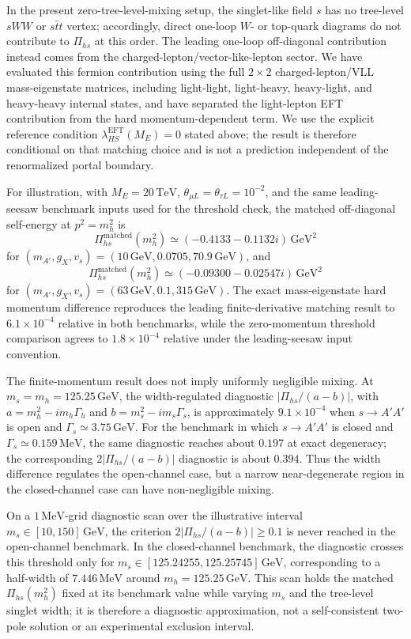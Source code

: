 \documentclass[12pt,a4paper]{article}
\begin{document}
In the present zero-tree-level-mixing setup, the singlet-like field \(s\) has no tree-level \(sWW\) or \(s\bar t t\) vertex; accordingly, direct one-loop \(W\)- or top-quark diagrams do not contribute to \(\Pi_{hs}\) at this order. The leading one-loop off-diagonal contribution instead comes from the charged-lepton/vector-like-lepton sector. We have evaluated this fermion contribution using the full \(2\times2\) charged-lepton/VLL mass-eigenstate matrices, including light-light, light-heavy, heavy-light, and heavy-heavy internal states, and have separated the light-lepton EFT contribution from the hard momentum-dependent term. We use the explicit reference condition \(\lambda_{HS}^{\mathrm{EFT}}(M_E)=0\) stated above; the result is therefore conditional on that matching choice and is not a prediction independent of the renormalized portal boundary.

For illustration, with \(M_E=20\,\mathrm{TeV}\), \(\theta_{\mu L}=\theta_{\tau L}=10^{-2}\), and the same leading-seesaw benchmark inputs used for the threshold check, the matched off-diagonal self-energy at \(p^2=m_h^2\) is
\[
\Pi_{hs}^{\mathrm{matched}}(m_h^2)
\simeq(-0.4133-0.1132i)\,\mathrm{GeV}^2
\]
for \((m_{A'},g_X,v_s)=(10\,\mathrm{GeV},0.0705,70.9\,\mathrm{GeV})\), and
\[
\Pi_{hs}^{\mathrm{matched}}(m_h^2)
\simeq(-0.09300-0.02547i)\,\mathrm{GeV}^2
\]
for \((m_{A'},g_X,v_s)=(63\,\mathrm{GeV},0.1,315\,\mathrm{GeV})\). The exact mass-eigenstate hard momentum difference reproduces the leading finite-derivative matching result to \(6.1\times10^{-4}\) relative in both benchmarks, while the zero-momentum threshold comparison agrees to \(1.8\times10^{-4}\) relative under the leading-seesaw input convention.

The finite-momentum result does not imply uniformly negligible mixing. At \(m_s=m_h=125.25\,\mathrm{GeV}\), the width-regulated diagnostic \(|\Pi_{hs}/(a-b)|\), with \(a=m_h^2-i m_h\Gamma_h\) and \(b=m_s^2-i m_s\Gamma_s\), is approximately \(9.1\times10^{-4}\) when \(s\to A'A'\) is open and \(\Gamma_s\simeq3.75\,\mathrm{GeV}\). For the benchmark in which \(s\to A'A'\) is closed and \(\Gamma_s\simeq0.159\,\mathrm{MeV}\), the same diagnostic reaches about \(0.197\) at exact degeneracy; the corresponding \(2|\Pi_{hs}/(a-b)|\) diagnostic is about \(0.394\). Thus the width difference regulates the open-channel case, but a narrow near-degenerate region in the closed-channel case can have non-negligible mixing.

On a \(1\,\mathrm{MeV}\)-grid diagnostic scan over the illustrative interval \(m_s\in[10,150]\,\mathrm{GeV}\), the criterion \(2|\Pi_{hs}/(a-b)|\geq0.1\) is never reached in the open-channel benchmark. In the closed-channel benchmark, the diagnostic crosses this threshold only for \(m_s\in[125.24255,125.25745]\,\mathrm{GeV}\), corresponding to a half-width of \(7.446\,\mathrm{MeV}\) around \(m_h=125.25\,\mathrm{GeV}\). This scan holds the matched \(\Pi_{hs}(m_h^2)\) fixed at its benchmark value while varying \(m_s\) and the tree-level singlet width; it is therefore a diagnostic approximation, not a self-consistent two-pole solution or an experimental exclusion interval.
\end{document}
